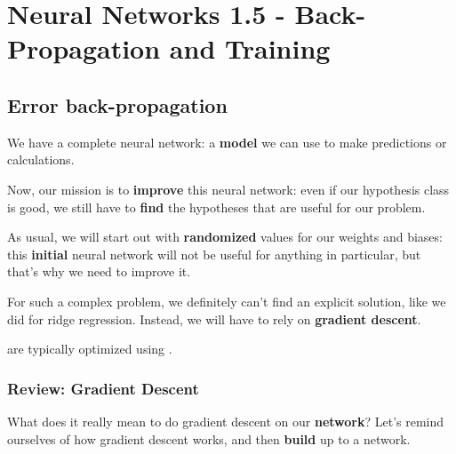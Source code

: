\setcounter{chapter}{7-1}

\chapter{Neural Networks 1.5 - Back-Propagation and Training}


\setcounter{section}{4}
\section{Error back-propagation }

    We have a complete neural network: a \textbf{model} we can use to make predictions or calculations.
    
    Now, our mission is to \textbf{improve} this neural network: even if our hypothesis class is good, we still have to \textbf{find} the hypotheses that are useful for our problem.
    
    As usual, we will start out with \textbf{randomized} values for our weights and biases: this \textbf{initial} neural network will not be useful for anything in particular, but that's why we need to improve it.
    
    For such a complex problem, we definitely can't find an explicit solution, like we did for ridge regression. Instead, we will have to rely on \textbf{gradient descent}.\\
    
    \begin{concept}
         are typically optimized using .
    \end{concept}
    
    \secdiv
    
    \subsection{Review: Gradient Descent}
    
        What does it really mean to do gradient descent on our \textbf{network}? Let's remind ourselves of how gradient descent works, and then \textbf{build} up to a network.
        
